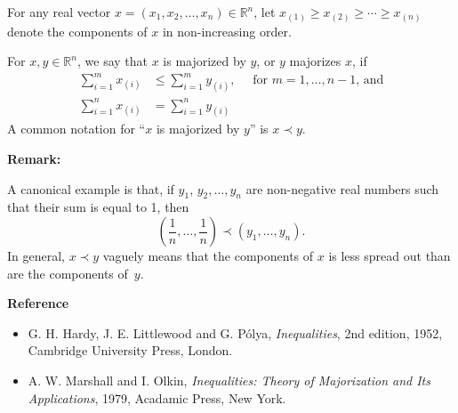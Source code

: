 \documentclass[12pt]{article}
\begin{document}
For any real vector $x = (x_1,x_2,\ldots,x_n)\in \mathbb{R}^n$, let $x_{(1)}\geq x_{(2)} \geq \cdots \geq x_{(n)}$ denote the components of $x$ in non-increasing order.

For $x, y \in \mathbb{R}^n$, we say that $x$ is majorized by $y$, or $y$ majorizes $x$, if
\begin{align*}
 \sum_{i=1}^m x_{(i)} &\leq \sum_{i=1}^m y_{(i)}, \quad \text{ for $m=1,\ldots, n-1$, and} \\
 \sum_{i=1}^n x_{(i)} &= \sum_{i=1}^n y_{(i)}
\end{align*} 
A common notation for ``$x$ is majorized by $y$'' is $x \prec y$.


{\bf Remark:}

A canonical example is that, if $y_1$, $y_2, \ldots, y_n$ are non-negative real numbers such that their sum is equal to 1, then
\[
 \left(\frac{1}{n},\ldots,\frac{1}{n} \right) \prec (y_1,\ldots,y_n).
\]
In general, $x\prec y$ vaguely means that the components of $x$ is less spread out than are the components of~$y$.


{\bf Reference}

\begin{itemize}
\item G. H. Hardy, J. E. Littlewood and G. P{\'o}lya, {\em Inequalities}, 2nd edition, 1952, Cambridge University Press, London.

\item A. W. Marshall and I. Olkin, {\em Inequalities: Theory of Majorization and Its Applications}, 1979, Acadamic Press, New York.
\end{itemize}
\end{document}

